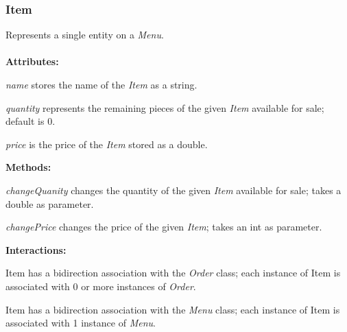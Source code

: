 \subsubsection{Item}
Represents a single entity on a \emph{Menu}.\\ \\
\textbf{Attributes:}
\begin{description}
\item\textit{name} stores the name of the \emph{Item} as a string.
\item\textit{quantity} represents the remaining pieces of the given \emph{Item} available for sale; default is 0.
\item\textit{price} is the price of the \emph{Item} stored as a double.
\end{description}
\textbf{Methods:}
\begin{description}
\item\textit{changeQuanity} changes the quantity of the given \emph{Item} available for sale; takes a double as parameter.
\item\textit{changePrice} changes the price of the given \emph{Item}; takes an int as parameter.
\end{description}
\textbf{Interactions:}
\begin{description}
\item Item has a bidirection association with the \emph{Order} class; each instance of Item is associated with 0 or more instances of \emph{Order}.
\item Item has a bidirection association with the \emph{Menu} class; each instance of Item is associated with 1 instance of \emph{Menu}.
\end{description}
\vspace{.2cm}

